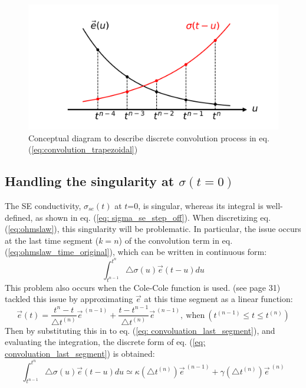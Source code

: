 \documentclass[manuscript]{geophysics}
\newcommand{\dsig}{\triangle\sigma}
\newcommand {\e}  { {\vec e} }
\begin{document}
\begin{figure}[htb]
  \centering
  \includegraphics[width=1.0\textwidth]{figures/convolution_concept.png}
  \caption{Conceptual diagram to describe discrete convolution process in eq. (\ref{eq:convolution_trapezoidal})}
  \label{fig:convolution_concept}
\end{figure}

\subsection{Handling the singularity at $\sigma(t=0)$}
\label{app: Handling singularity}
The SE conductivity, $\sigma_{se}(t)$ at $t$=0, is singular, whereas its integral is well-defined, as shown in eq. (\ref{eq: sigma_se_step_off}). When discretizing eq. (\ref{eq:ohmslaw}), this singularity will be problematic. In particular, the issue occurs at the last time segment ($k=n$) of the convolution term in eq. (\ref{eq:ohmslaw_time_original}), which can be written in continuous form:
\begin{equation}
  \int_{t^{n-1}}^{t^{n}} \dsig(u) \e(t-u) du
  \label{eq: convoluation_last_segment}
\end{equation}
This problem also occurs when the Cole-Cole function is used. \cite{marchant2015} (see page 31) tackled this issue by approximating $\e$ at this time segment as a linear function:
\begin{equation}
  \e(t) = \frac{t^{n}-t}{\triangle t^{(n)}} \e^{ \ (n-1)} + \frac{t-t^{n-1}}{\triangle t^{(n)}} \e^{ \ (n-1)}, \ \text{when} \ (t^{(n-1)}\leq t \leq t^{(n)})
\end{equation}
Then by substituting this in to eq. (\ref{eq: convoluation_last_segment}), and evaluating the integration, the discrete form of eq. (\ref{eq: convoluation_last_segment}) is obtained:
\begin{equation}
  \int_{t^{n-1}}^{t^{n}} \dsig(u) \e(t-u) du \simeq
  \kappa(\triangle t^{(n)}) \e^{\ (n-1)} + \gamma(\triangle t^{(n)}) \e^{\ (n)}
\end{equation}
\end{document}
